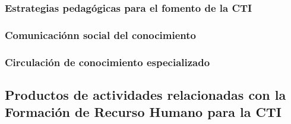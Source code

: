 \documentclass{article}
\begin{document}
\subsubsection{Estrategias pedag\'ogicas para el fomento de la CTI}

\subsubsection{Comunicaci\'onn social del conocimiento}

\subsubsection{Circulaci\'on de conocimiento especializado}


\subsection{Productos de actividades relacionadas con la Formación de Recurso
Humano para la CTI }


\end{document}

